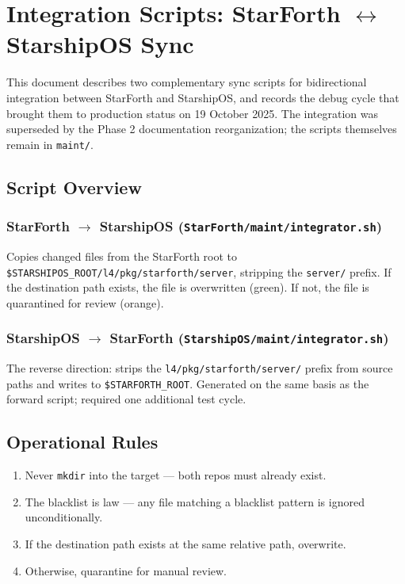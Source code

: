 
\section{Integration Scripts: StarForth $\leftrightarrow$ StarshipOS Sync}

This document describes two complementary sync scripts for bidirectional
integration between StarForth and StarshipOS, and records the debug cycle
that brought them to production status on 19 October 2025. The integration
was superseded by the Phase 2 documentation reorganization; the scripts
themselves remain in \texttt{maint/}.

\subsection{Script Overview}

\subsubsection{StarForth $\to$ StarshipOS (\texttt{StarForth/maint/integrator.sh})}

Copies changed files from the StarForth root to
\texttt{\$STARSHIPOS\_ROOT/l4/pkg/starforth/server}, stripping the
\texttt{server/} prefix. If the destination path exists, the file is
overwritten (green). If not, the file is quarantined for review (orange).

\subsubsection{StarshipOS $\to$ StarForth (\texttt{StarshipOS/maint/integrator.sh})}

The reverse direction: strips the \texttt{l4/pkg/starforth/server/} prefix
from source paths and writes to \texttt{\$STARFORTH\_ROOT}. Generated on the
same basis as the forward script; required one additional test cycle.

\subsection{Operational Rules}

\begin{enumerate}
  \item Never \texttt{mkdir} into the target — both repos must already exist.
  \item The blacklist is law — any file matching a blacklist pattern is
        ignored unconditionally.
  \item If the destination path exists at the same relative path, overwrite.
  \item Otherwise, quarantine for manual review.
\end{enumerate}

